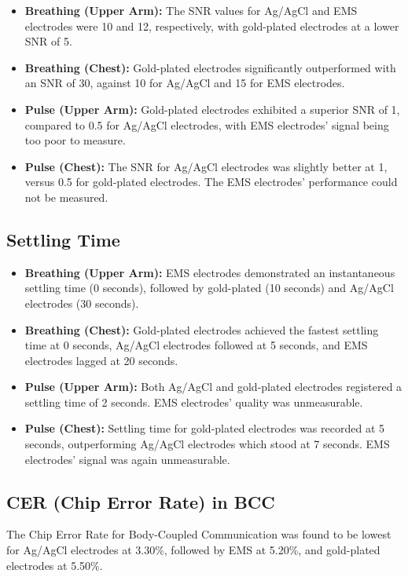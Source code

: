 \documentclass[conference]{IEEEtran}
\begin{document}
\begin{itemize}
    \item \textbf{Breathing (Upper Arm):} The SNR values for Ag/AgCl and EMS electrodes were 10 and 12, respectively, with gold-plated electrodes at a lower SNR of 5.
    \item \textbf{Breathing (Chest):} Gold-plated electrodes significantly outperformed with an SNR of 30, against 10 for Ag/AgCl and 15 for EMS electrodes.
    \item \textbf{Pulse (Upper Arm):} Gold-plated electrodes exhibited a superior SNR of 1, compared to 0.5 for Ag/AgCl electrodes, with EMS electrodes' signal being too poor to measure.
    \item \textbf{Pulse (Chest):} The SNR for Ag/AgCl electrodes was slightly better at 1, versus 0.5 for gold-plated electrodes. The EMS electrodes' performance could not be measured.
\end{itemize}

\subsection{Settling Time}

\begin{itemize}
    \item \textbf{Breathing (Upper Arm):} EMS electrodes demonstrated an instantaneous settling time (0 seconds), followed by gold-plated (10 seconds) and Ag/AgCl electrodes (30 seconds).
    \item \textbf{Breathing (Chest):} Gold-plated electrodes achieved the fastest settling time at 0 seconds, Ag/AgCl electrodes followed at 5 seconds, and EMS electrodes lagged at 20 seconds.
    \item \textbf{Pulse (Upper Arm):} Both Ag/AgCl and gold-plated electrodes registered a settling time of 2 seconds. EMS electrodes' quality was unmeasurable.
    \item \textbf{Pulse (Chest):} Settling time for gold-plated electrodes was recorded at 5 seconds, outperforming Ag/AgCl electrodes which stood at 7 seconds. EMS electrodes' signal was again unmeasurable.
\end{itemize}

\subsection{CER (Chip Error Rate) in BCC}

The Chip Error Rate for Body-Coupled Communication was found to be lowest for Ag/AgCl electrodes at 3.30\%, followed by EMS at 5.20\%, and gold-plated electrodes at 5.50\%.
\end{document}
